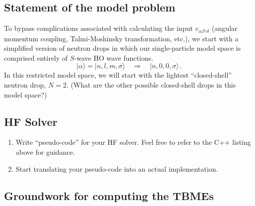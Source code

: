 \documentclass[letterpaper,12pt]{article}
\begin{document}
\subsection{ Statement of the model problem}

To bypass complications associated with calculating the input $v_{\alpha\beta\gamma\delta}$  (angular momentum coupling, Talmi-Moshinsky transformation, etc.), we start with a simplified version of neutron drops in which our single-particle model space is comprised entirely of $S$-wave HO wave functions. 
\begin{equation}
|\alpha\rangle = |n,l,m,\sigma\rangle \quad\Rightarrow\quad |n,0,0,\sigma\rangle\,. 
\end{equation} 
In this restricted model space, we will start with the lightest ``closed-shell'' neutron drop, $N=2$. (What are the other possible closed-shell drops in this model space?)


\subsection{HF Solver}

\begin{enumerate}
\item Write ``pseudo-code'' for your HF solver. Feel free to refer to the C++ listing above for guidance.  
\item Start translating your pseudo-code into an actual implementation. 
\end{enumerate}


\subsection{Groundwork for computing the TBMEs}
\end{document}
